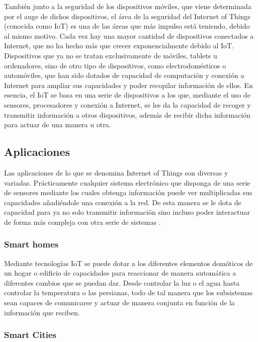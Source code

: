 También junto a la seguridad de los dispositivos móviles, que viene determinada por el auge de dichos dispositivos, el área de la seguridad del Internet of Things (conocida como IoT) es una de las áreas que más impulso está teniendo, debido al mismo motivo. Cada vez hay una mayor cantidad de dispositivos conectados a Internet, que no ha hecho más que crecer exponencialmente debido al IoT. Dispositivos que ya no se tratan exclusivamente de móviles, tablets u ordenadores, sino de otro tipo de dispositivos, como electrodomésticos o automóviles, que han sido dotados de capacidad de computación y conexión a Internet para ampliar sus capacidades y poder recopilar información de ellos. En esencia, el IoT se basa en una serie de dispositivos a los que, mediante el uso de sensores, procesadores y conexión a Internet, se les da la capacidad de recoger y transmitir información a otros dispositivos, además de recibir dicha información para actuar de una manera u otra.

\subsection{Aplicaciones}

Las aplicaciones de lo que se denomina Internet of Things son diversas y variadas. Prácticamente cualquier sistema electrónico que disponga de una serie de sensores mediante los cuales obtenga información puede ver multiplicadas sus capacidades añadiéndole una conexión a la red. De esta manera se le dota de capacidad para ya no solo transmitir información sino incluso poder interactuar de forma más compleja con otra serie de sistemas \cite{Miorandi20121497} \cite{Gubbi20131645}.
	
\subsubsection{Smart homes}

Mediante tecnologías IoT se puede dotar a los diferentes elementos domóticos de un hogar o edificio de capacidades para reaccionar de manera automática a diferentes cambios que se puedan dar. Desde controlar la luz o el agua hasta controlar la temperatura o las persianas, todo de tal manera que los subsistemas sean capaces de comunicarse y actuar de manera conjunta en función de la información que reciben.
	
\subsubsection{Smart Cities}

